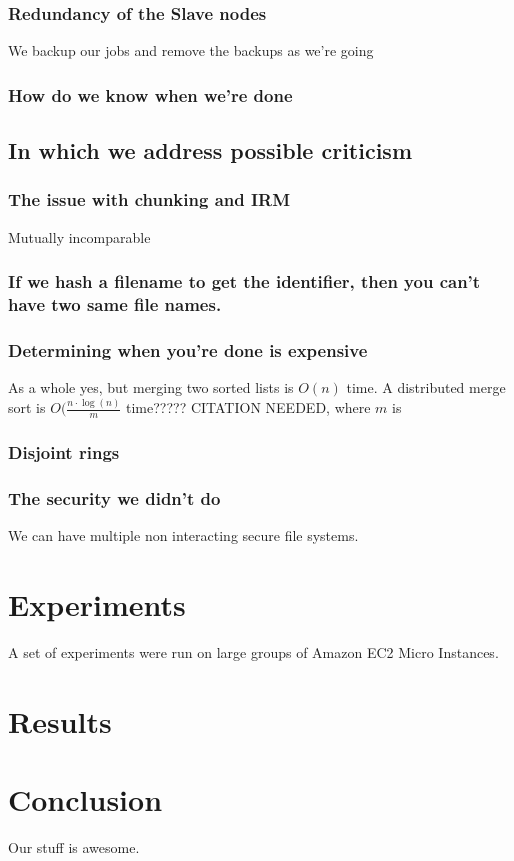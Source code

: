 \documentclass[conference, compsocconf, letterpaper]{IEEEtran}
\begin{document}
\subsubsection{Redundancy of the Slave nodes}
We backup our jobs and remove the backups as we're going

\subsubsection{How do we know when we're done}


\subsection{In which we address possible criticism}
\subsubsection{The issue with chunking and IRM}
Mutually incomparable

\subsubsection{If we hash a filename to get the identifier, then you can't have two same file names.}
\subsubsection{Determining when you're done is expensive}
As a whole yes, but merging two sorted lists is $O(n)$ time.  A distributed merge sort is $O( \frac{n \cdot \log (n)}{m} $ time????? CITATION NEEDED, where $m$ is 


\subsubsection{Disjoint rings}

\subsubsection{The security we didn't do}
We can have multiple non interacting secure file systems.


\section{Experiments}
A set of experiments were run on large groups of Amazon EC2 Micro Instances\cite{amazon-micro}.
\section{Results}

\section{Conclusion}
Our stuff \cite{code} is awesome.



\end{document}
